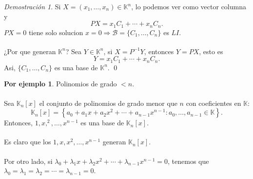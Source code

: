 \documentclass{article}
\theoremstyle{definition}
\theoremstyle{definition}
\newtheorem*{ej}{Por ejemplo}
\theoremstyle{remark}
\newtheorem*{demo}{Demostración}
\begin{document}
\begin{demo}
  Si $X=(x_1,\dots,x_n) \in \mathbb{K}^n$, lo podemos ver como vector columna y \[
PX=x_1C_1+ \cdots + x_n C_n. 
  \]
  $PX=0$ tiene solo solucion $x=0 \Rightarrow \mathcal{B}=\{C_1, \dots ,C_n\}$ es $LI$. \\\\ ¿Por que generan $\mathbb{K}^n$? Sea $Y \in \mathbb{K}^n$, si $X=P^{-1}Y$, entonces $Y=PX$, esto es \[
Y=x_1C_1+\cdots + x_n C_n. 
  \]
  Asi, $\{C_1, \dots, C_n\}$ es una base de $\mathbb{K}^n$. \qed
\end{demo}
\begin{ej}
  Polinomios de grado $ < n$. \\\\ Sea $\mathbb{K}_n[x]$ el conjunto de polinomios de grado menor que $n$ con coeficientes en $\mathbb{K}$: \[
    \mathbb{K}_n[x]=\left\{a_0+a_1x+a_2x^2+\cdots +a_{n-1}x^{n-1}: a_0, \dots , a_{n-1} \in \mathbb{K}\right\}.
  \]
  Entonces, $1,x,^2,\dots,x^{n-1}$ es una base de $\mathbb{K}_n[x]$. \\\\ Es claro que los $1,x,x^2,\dots, x^{n-1}$ generan $\mathbb{K}_n[x]$. \\\\ Por otro lado, si $\lambda_0 +\lambda_1x+ \lambda_2 x^2 + \cdots + \lambda_{n-1}x^{n-1}=0$, tenemos que \\$\lambda_0=\lambda_1=\lambda_2=\cdots =\lambda_{n-1}=0$.
\end{ej}\pagebreak
\end{document}
